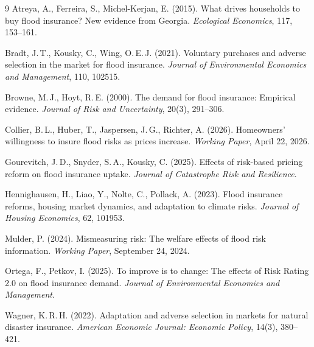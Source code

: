 \documentclass[11pt]{article}
\begin{document}

\begin{thebibliography}{9}
Atreya, A., Ferreira, S., Michel-Kerjan, E. (2015).
What drives households to buy flood insurance? New evidence from Georgia.
\textit{Ecological Economics}, 117, 153--161.

Bradt, J.\,T., Kousky, C., Wing, O.\,E.\,J. (2021).
Voluntary purchases and adverse selection in the market for flood insurance.
\textit{Journal of Environmental Economics and Management}, 110, 102515.

Browne, M.\,J., Hoyt, R.\,E. (2000).
The demand for flood insurance: Empirical evidence.
\textit{Journal of Risk and Uncertainty}, 20(3), 291--306.

Collier, B.\,L., Huber, T., Jaspersen, J.\,G., Richter, A. (2026).
Homeowners' willingness to insure flood risks as prices increase.
\textit{Working Paper}, April 22, 2026.

Gourevitch, J.\,D., Snyder, S.\,A., Kousky, C. (2025).
Effects of risk-based pricing reform on flood insurance uptake.
\textit{Journal of Catastrophe Risk and Resilience}.

Hennighausen, H., Liao, Y., Nolte, C., Pollack, A. (2023).
Flood insurance reforms, housing market dynamics, and adaptation to climate risks.
\textit{Journal of Housing Economics}, 62, 101953.

Mulder, P. (2024).
Mismeasuring risk: The welfare effects of flood risk information.
\textit{Working Paper}, September 24, 2024.

Ortega, F., Petkov, I. (2025).
To improve is to change: The effects of Risk Rating 2.0 on flood insurance demand.
\textit{Journal of Environmental Economics and Management}.

Wagner, K.\,R.\,H. (2022).
Adaptation and adverse selection in markets for natural disaster insurance.
\textit{American Economic Journal: Economic Policy}, 14(3), 380--421.
\end{thebibliography}
\end{document}
